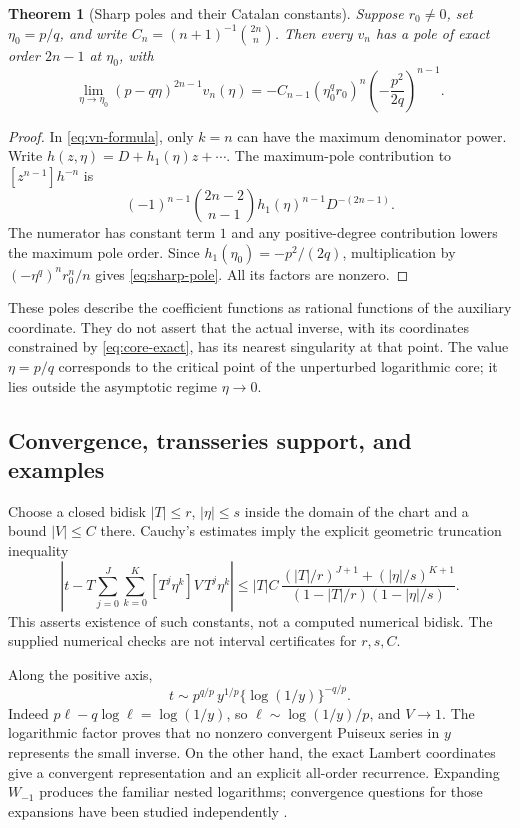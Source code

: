 \documentclass[11pt,a4paper]{article}
\numberwithin{equation}{section}
\newtheorem{theorem}{Theorem}[section]
\theoremstyle{definition}
\theoremstyle{remark}
\begin{document}
\begin{theorem}[Sharp poles and their Catalan constants]
\label{thm:sharp-poles}
Suppose $r_0\ne0$, set $\eta_0=p/q$, and write
$C_n=(n+1)^{-1}\binom{2n}{n}$. Then every $v_n$ has a pole of
exact order $2n-1$ at $\eta_0$, with
\begin{equation}\label{eq:sharp-pole}
 \lim_{\eta\to\eta_0}(p-q\eta)^{2n-1}v_n(\eta)
 =-C_{n-1}(\eta_0^qr_0)^n
           \left(-\frac{p^2}{2q}\right)^{n-1}.
\end{equation}
\end{theorem}
\begin{proof}
In \eqref{eq:vn-formula}, only $k=n$ can have the maximum
denominator power. Write $h(z,\eta)=D+h_1(\eta)z+\cdots$.
The maximum-pole contribution to $[z^{n-1}]h^{-n}$ is
\[
 (-1)^{n-1}\binom{2n-2}{n-1}
       h_1(\eta)^{n-1}D^{-(2n-1)}.
\]
The numerator has constant term $1$ and any positive-degree
contribution lowers the maximum pole order. Since
$h_1(\eta_0)=-p^2/(2q)$, multiplication by
$(-\eta^q)^nr_0^n/n$ gives \eqref{eq:sharp-pole}. All its factors
are nonzero.
\end{proof}

These poles describe the coefficient functions as rational functions
of the auxiliary coordinate. They do not assert that the actual
inverse, with its coordinates constrained by \eqref{eq:core-exact},
has its nearest singularity at that point. The value $\eta=p/q$
corresponds to the critical point of the unperturbed logarithmic core;
it lies outside the asymptotic regime $\eta\to0$.

\subsection{Convergence, transseries support, and examples}

Choose a closed bidisk $|T|\le r$, $|\eta|\le s$ inside the domain
of the chart and a bound $|V|\le C$ there. Cauchy's estimates imply
the explicit geometric truncation inequality
\begin{equation}\label{eq:geometric-inverse}
 \left|t-T\sum_{j=0}^{J}\sum_{k=0}^{K}
       [T^j\eta^k]V\,T^j\eta^k\right|
 \le |T|C\,
 \frac{(|T|/r)^{J+1}+(|\eta|/s)^{K+1}}
      {(1-|T|/r)(1-|\eta|/s)}.
\end{equation}
This asserts existence of such constants, not a computed numerical
bidisk. The supplied numerical checks are not interval certificates
for $r,s,C$.

Along the positive axis,
\begin{equation}\label{eq:leading-inverse}
 t\sim p^{q/p}\,y^{1/p}\{\log(1/y)\}^{-q/p}.
\end{equation}
Indeed $p\ell-q\log\ell=\log(1/y)$, so
$\ell\sim\log(1/y)/p$, and $V\to1$. The logarithmic factor proves
that no nonzero convergent Puiseux series in $y$ represents the
small inverse. On the other hand, the exact Lambert coordinates
give a convergent representation and an explicit all-order recurrence.
Expanding $W_{-1}$ produces the familiar nested logarithms; convergence
questions for those expansions have been studied independently
\cite{corless,kalugin}.
\end{document}
